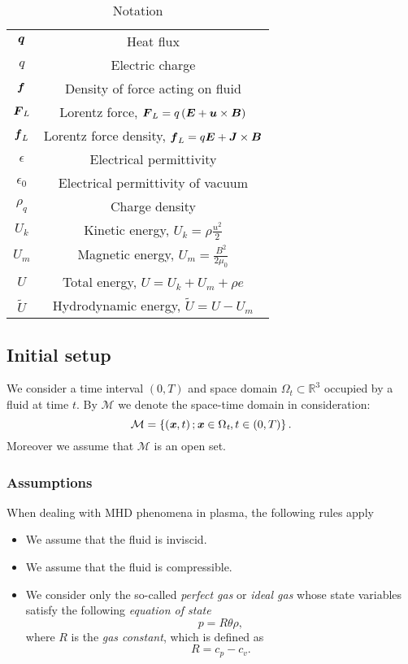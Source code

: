 \begin{table}
\begin{tabular}{ |c|c| }
        $\mbox{\boldmath $q$}$ & Heat flux\\
        $q$ & Electric charge\\
        $\mbox{\boldmath $f$}$ & Density of force acting on fluid\\
        $\mbox{\boldmath $F$}_L$ & Lorentz force, $\mbox{\boldmath $F$}_L = q\left(\mbox{\boldmath $E$} + \mbox{\boldmath $u$}\times\mbox{\boldmath $B$}\right)$\\
        $\mbox{\boldmath $f$}_L$ & Lorentz force density, $\mbox{\boldmath $f$}_L = q\mbox{\boldmath $E$} + \mbox{\boldmath $J$}\times\mbox{\boldmath $B$}$\\
        $\epsilon$ & Electrical permittivity\\
        $\epsilon_0$ & Electrical permittivity of vacuum\\
        $\rho_q$ & Charge density\\
        $U_k$ & Kinetic energy, $U_k = \rho\frac{u^2}{2}$ \\ 
        $U_m$ & Magnetic energy, $U_m = \frac{B^2}{2{}\mu_0}$ \\ 
        $U$ & Total energy, $U = U_k + U_m + \rho e$ \\ 
        $\tilde{U}$ & Hydrodynamic energy, $\tilde{U} = U - U_m$ \\ 
        \hline
    \end{tabular}
    \caption{Notation}
    \label{table:notation}
\end{table}

\subsection{Initial setup}

We consider a time interval $\left(0,T\right)$ and space domain $\Omega_{\textit{t}}\subset \mathbb{R}^3$ occupied by a fluid at time $t$.
By $\mathcal{M}$ we denote the space-time domain in consideration: 
\begin{equation}\label{M}
\mathcal{M}=\left\{\left(\textbf{\textit{x}},t\right);\\\textbf{\textit{x}}\in\Omega_{\textit{t}},t\in\left(0,T\right)\right \}.
\end{equation}
Moreover we assume that $\mathcal{M}$ is an open set.

\subsubsection{Assumptions}
When dealing with MHD phenomena in plasma, the following rules apply
\begin{itemize}
    \item We assume that the fluid is inviscid.
    \item We assume that the fluid is compressible.
    \item We consider only the so-called \textit{perfect gas} or \textit{ideal gas} whose state variables satisfy the following \textit{equation of state}
    \begin{equation}\label{start_therm}
    p = R\theta\rho,
    \end{equation}
    where $R$ is the \textit{gas constant}, which is defined as 
    \begin{equation}
    R = c_p - c_v.
    \end{equation} 
\end{itemize}

